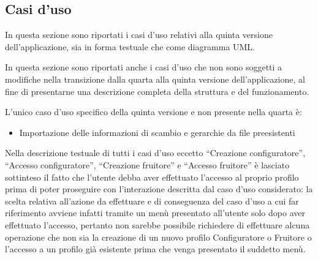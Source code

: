 \subsection{Casi d'uso}
In questa sezione sono riportati i casi d'uso relativi alla quinta versione dell'applicazione, sia in forma testuale che come diagramma UML.\bigskip 

In questa sezione sono riportati anche i casi d'uso che non sono soggetti a modifiche nella transizione dalla quarta alla quinta versione dell'applicazione, al fine di presentarne una descrizione completa della struttura e del funzionamento.\bigskip

L'unico caso d'uso specifico della quinta versione e non presente nella quarta è:
\begin{itemize}
    \item Importazione delle informazioni di scambio e gerarchie da file preesistenti
\end{itemize} \bigskip

Nella descrizione testuale di tutti i casi d'uso eccetto ``Creazione configuratore'', ``Accesso configuratore'', ``Creazione fruitore'' e ``Accesso fruitore'' è lasciato sottinteso il fatto che l'utente debba aver effettuato l'accesso al proprio profilo prima di poter proseguire con l'interazione descritta dal caso d'uso considerato: la scelta relativa all'azione da effettuare e di conseguenza del caso d'uso a cui far riferimento avviene infatti tramite un menù presentato all'utente solo dopo aver effettuato l'accesso, pertanto non sarebbe possibile richiedere di effettuare alcuna operazione che non sia la creazione di un nuovo profilo Configuratore o Fruitore o l'accesso a un profilo già esistente prima che venga presentato il suddetto menù.\bigskip



